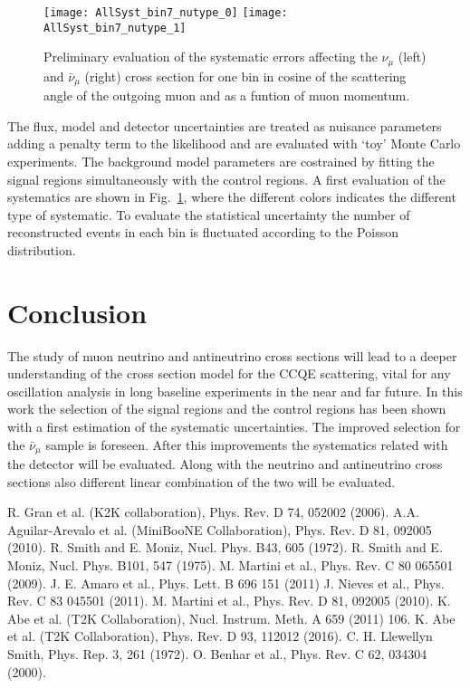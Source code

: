 \documentclass[12pt]{article}
\begin{document}
\begin{figure}[htbp]
	\centering
	\texttt{[image: AllSyst\_bin7\_nutype\_0]}
	\texttt{[image: AllSyst\_bin7\_nutype\_1]}
	\caption{Preliminary evaluation of the systematic errors affecting the $\nu_\mu$ (left) and $\bar{\nu}_\mu$ (right) cross section for one bin in cosine of the scattering angle of the outgoing muon and as a funtion of muon momentum.}\label{fig:allsyst}
\end{figure}

\noindent
The flux, model and detector uncertainties are treated as nuisance parameters adding a penalty term to the likelihood and are evaluated with `toy' Monte Carlo experiments. The background model parameters are costrained by fitting the signal regions simultaneously with the control regions. A first evaluation of the systematics are shown in Fig.~\ref{fig:allsyst}, where the different colors indicates the different type of systematic. To evaluate the statistical uncertainty the number of reconstructed events in each bin is fluctuated according to the Poisson distribution.
 
\section{Conclusion}

The study of muon neutrino and antineutrino cross sections will lead to a deeper understanding of the cross section model for the CCQE scattering, vital for any oscillation analysis in long baseline experiments in the near and far future. In this work the selection of the signal regions and the control regions has been shown with a first estimation of the systematic uncertainties. The improved selection for the $\bar{\nu}_\mu$ sample is foreseen. After this improvements the systematics related with the detector will be evaluated. Along with the neutrino and antineutrino cross sections also different linear combination of the two will be evaluated.

\begin{thebibliography}{99}

R. Gran et al. (K2K collaboration), Phys. Rev. D 74, 052002 (2006).
A.A. Aguilar-Arevalo et al. (MiniBooNE Collaboration), Phys. Rev. D 81, 092005 (2010).
R. Smith and E. Moniz, Nucl. Phys. B43, 605 (1972).
R. Smith and E. Moniz, Nucl. Phys. B101, 547 (1975).
M. Martini et al., Phys. Rev. C 80 065501 (2009).
J. E. Amaro et al., Phys. Lett. B 696 151 (2011)
J. Nieves et al., Phys. Rev. C 83 045501 (2011).
 M. Martini et al., Phys. Rev. D 81, 092005 (2010).
K. Abe et al. (T2K Collaboration), Nucl.  Instrum.  Meth.  A 659 (2011)  106.
K. Abe et al. (T2K Collaboration), Phys. Rev. D 93, 112012 (2016).	
C. H. Llewellyn Smith, Phys. Rep. 3, 261 (1972).
O. Benhar et al., Phys. Rev. C 62, 034304 (2000).


\end{thebibliography}

 
\end{document}
